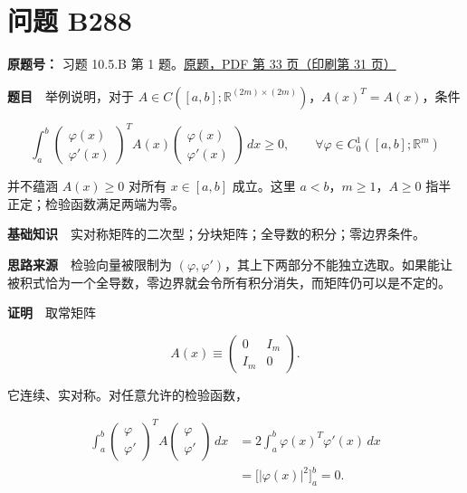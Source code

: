 \documentclass[11pt,a4paper]{article}
\begin{document}
\section{问题 B288}\label{ux95eeux9898-b288}

\textbf{原题号：} 习题 10.5.B 第 1
题。\href{https://zj139.github.io/math-notes/files/problems/楼分析习题-v2.pdf\#page=33}{原题，PDF
第 33 页（印刷第 31 页）}

\textbf{题目}　举例说明，对于
\(A\in C([a,b];\mathbb R^{(2m)\times(2m)})\)，\(A(x)^T=A(x)\)，条件

\begin{equation}
\int_a^b
\begin{pmatrix}\varphi(x)\\\varphi'(x)\end{pmatrix}^{T}
A(x)
\begin{pmatrix}\varphi(x)\\\varphi'(x)\end{pmatrix}\,dx
\ge0,\qquad
\forall\varphi\in C_0^1([a,b];\mathbb R^m)
\tag{33}
\end{equation}

并不蕴涵 \(A(x)\ge0\) 对所有 \(x\in[a,b]\) 成立。这里
\(a<b\)，\(m\ge1\)，\(A\ge0\) 指半正定；检验函数满足两端为零。

\textbf{基础知识}　实对称矩阵的二次型；分块矩阵；全导数的积分；零边界条件。

\textbf{思路来源}　检验向量被限制为
\((\varphi,\varphi')\)，其上下两部分不能独立选取。如果能让被积式恰为一个全导数，零边界就会令所有积分消失，而矩阵仍可以是不定的。

\textbf{证明}　取常矩阵

\begin{equation}
A(x)\equiv
\begin{pmatrix}0&I_m\\I_m&0\end{pmatrix}.
\tag{34}
\end{equation}

它连续、实对称。对任意允许的检验函数，

\begin{equation}
\begin{aligned}
\int_a^b
\begin{pmatrix}\varphi\\\varphi'\end{pmatrix}^{T}
A
\begin{pmatrix}\varphi\\\varphi'\end{pmatrix}\,dx
&=2\int_a^b\varphi(x)^T\varphi'(x)\,dx\\
&=\big[|\varphi(x)|^2\big]_a^b=0.
\end{aligned}
\tag{35}
\end{equation}
\end{document}
